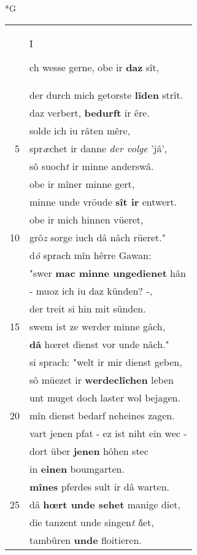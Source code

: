 \documentclass[8pt,a4paper,notitlepage]{article}
\begin{document}
\begin{table}[ht]
\begin{minipage}[t]{0.5\linewidth}
\small
\begin{center}*G
\end{center}
\begin{tabular}{rl}
 & \begin{large}I\end{large}ch wesse gerne, obe ir \textbf{daz} sît,\\ 
 & der durch mich getorste \textbf{lîden} strît.\\ 
 & daz verbert, \textbf{bedurft} ir êre.\\ 
 & solde ich iu râten mêre,\\ 
5 & spr\textit{æ}chet ir danne \textit{der volge} 'jâ',\\ 
 & sô suoch\textit{t} ir minne anderswâ.\\ 
 & obe ir mîner minne gert,\\ 
 & minne unde vröude \textbf{sît ir} entwert.\\ 
 & obe ir mich hinnen vüeret,\\ 
10 & grô\textit{z} sorge iuch dâ nâch rüeret."\\ 
 & d\textit{ô} sprach mîn hêrre Gawan:\\ 
 & "swer \textbf{mac minne ungedienet} hân\\ 
 & - muoz ich iu daz künden? -,\\ 
 & der treit si hin mit sünden.\\ 
15 & swem ist ze werder minne gâch,\\ 
 & \textbf{dâ} hœret dienst vor unde nâch."\\ 
 & si sprach: "welt ir mir dienst geben,\\ 
 & sô müezet ir \textbf{werdeclîchen} leben\\ 
 & unt muget doch laster wol bejagen.\\ 
20 & mîn dienst bedarf neheines zagen.\\ 
 & vart jenen pfat - ez ist niht ein wec -\\ 
 & dort über \textbf{jenen} hôhen stec\\ 
 & in \textbf{einen} boumgarten.\\ 
 & \textbf{mînes} pferdes sult ir dâ warten.\\ 
25 & dâ \textbf{hœrt unde sehet} manige diet,\\ 
 & die tanzent unde singen\textit{t} \textit{l}iet,\\ 
 & tambûren \textbf{unde} floitieren.\\ 

\end{tabular}
\end{minipage}
\end{table}
\end{document}
